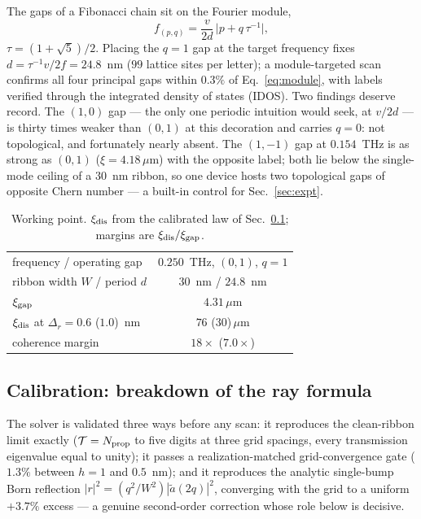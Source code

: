 \documentclass[aps,prl,preprint,superscriptaddress,longbibliography]{revtex4-2}
\begin{document}
The gaps of a Fibonacci chain sit on the Fourier module,
\begin{equation}
f_{(p,q)} = \frac{v}{2d}\,\bigl|p + q\,\tau^{-1}\bigr|,
\label{eq:module}
\end{equation}
$\tau = (1+\sqrt5)/2$. Placing the $q = 1$ gap at the target frequency fixes
$d = \tau^{-1} v/2f = 24.8$~nm ($99$ lattice sites per letter); a
module-targeted scan confirms all four principal gaps within $0.3\%$ of
Eq.~\eqref{eq:module}, with labels verified through the integrated density of
states (IDOS). Two findings deserve record. The $(1,0)$ gap --- the only one
periodic intuition would seek, at $v/2d$ --- is thirty times weaker than
$(0,1)$ at this decoration and carries $q = 0$: not topological, and
fortunately nearly absent. The $(1,-1)$ gap at $0.154$~THz is as strong as
$(0,1)$ ($\xi = 4.18\,\mu$m) with the opposite label; both lie below the
single-mode ceiling of a $30$~nm ribbon, so one device hosts two topological
gaps of opposite Chern number --- a built-in control for
Sec.~\ref{sec:expt}.

\begin{table}[b]
\caption{\label{tab:wp}Working point. $\xi_{\rm dis}$ from the calibrated
law of Sec.~\ref{sec:calib}; margins are $\xi_{\rm dis}/\xi_{\rm gap}$.}
\begin{ruledtabular}
\begin{tabular}{lc}
frequency / operating gap & $0.250$~THz, $(0,1)$, $q = 1$\\
ribbon width $W$ / period $d$ & $30$~nm / $24.8$~nm\\
$\xi_{\rm gap}$ & $4.31\,\mu$m\\
$\xi_{\rm dis}$ at $\Delta_r = 0.6$ ($1.0$)~nm & $76$ ($30$)\,$\mu$m\\
coherence margin & $18\times$ ($7.0\times$)\\
\end{tabular}
\end{ruledtabular}
\end{table}

\subsection{Calibration: breakdown of the ray formula}
\label{sec:calib}

The solver is validated three ways before any scan: it reproduces the
clean-ribbon limit exactly ($\mathcal{T} = N_{\rm prop}$ to five digits at
three grid spacings, every transmission eigenvalue equal to unity); it passes
a realization-matched grid-convergence gate ($1.3\%$ between $h = 1$ and
$0.5$~nm); and it reproduces the analytic single-bump Born reflection
$|r|^2 = (q^2/W^2)|\tilde a(2q)|^2$, converging with the grid to a uniform
$+3.7\%$ excess --- a genuine second-order correction whose role below is
decisive.
\end{document}
